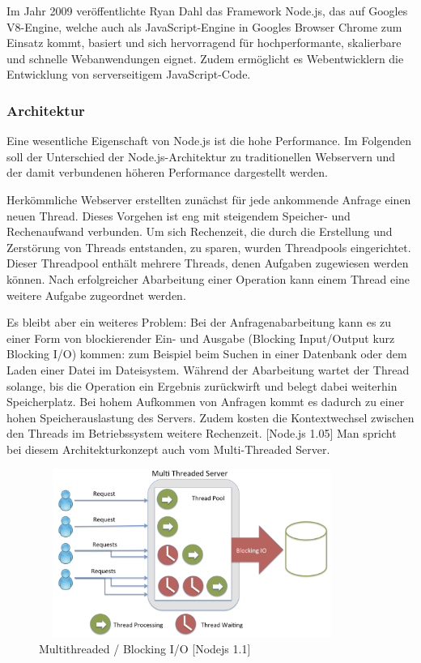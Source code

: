 Im Jahr 2009 veröffentlichte Ryan Dahl das Framework Node.js, das auf Googles V8-Engine, welche auch als JavaScript-Engine in Googles Browser Chrome zum Einsatz kommt, basiert und sich hervorragend für hochperformante, skalierbare und schnelle Webanwendungen eignet. Zudem ermöglicht es Webentwicklern die Entwicklung von serverseitigem JavaScript-Code. \-[NodeJS 1.0]


\subsubsection{Architektur}
Eine wesentliche Eigenschaft von Node.js ist die hohe Performance. Im Folgenden soll der Unterschied der Node.js-Architektur zu traditionellen Webservern und der damit verbundenen höheren Performance dargestellt werden.
\newline

\noindent
Herkömmliche Webserver erstellten zunächst für jede ankommende Anfrage einen neuen Thread. Dieses Vorgehen ist eng mit steigendem Speicher- und Rechenaufwand verbunden. Um sich Rechenzeit, die durch die Erstellung und Zerstörung von Threads entstanden, zu sparen, wurden Threadpools eingerichtet. Dieser Threadpool enthält mehrere Threads, denen Aufgaben zugewiesen werden können. Nach erfolgreicher Abarbeitung einer Operation kann einem Thread eine weitere Aufgabe zugeordnet werden.
\newline

\noindent
Es bleibt aber ein weiteres Problem: Bei der Anfragenabarbeitung kann es zu einer Form von blockierender Ein- und Ausgabe (Blocking Input/Output kurz Blocking I/O) kommen: zum Beispiel beim Suchen in einer Datenbank oder dem Laden einer Datei im Dateisystem.
 Während der Abarbeitung wartet der Thread solange, bis die Operation ein Ergebnis zurückwirft und belegt dabei weiterhin Speicherplatz. 
 Bei hohem Aufkommen von Anfragen kommt es dadurch zu einer hohen Speicherauslastung des Servers. Zudem kosten die Kontextwechsel zwischen den Threads im Betriebssystem weitere Rechenzeit. [Node.js 1.05] Man spricht bei diesem Architekturkonzept auch vom Multi-Threaded Server.
\newline

\begin{figure}[h]
\centering
\includegraphics[width=10cm, height = 5.5cm]{images/nodejs_otherthreading.png}
\caption{Multithreaded / Blocking I/O [Nodejs 1.1]}
\end{figure}
 
